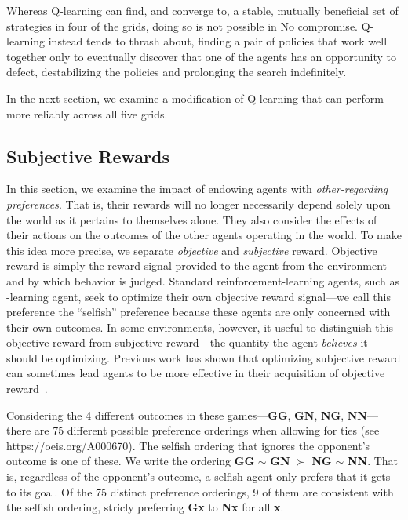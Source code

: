\documentclass[letterpaper]{article}
\begin{document}
Whereas Q-learning can find, and converge to, a stable, mutually
beneficial set of strategies in four of the grids, doing so is not
possible in No compromise. Q-learning instead tends to thrash about,
finding a pair of policies that work well together only to eventually
discover that one of the agents has an opportunity to defect,
destabilizing the policies and prolonging the search indefinitely.

In the next section, we examine a modification of Q-learning that can
perform more reliably across all five grids.

\subsection{Subjective Rewards}

In this section, we examine the impact of endowing agents
with \emph{other-regarding preferences}. That is, their rewards will
no longer necessarily depend solely upon the world as it pertains to
themselves alone. They also consider the effects of their actions on
the outcomes of the other agents operating in the world. To make this
idea more precise, we separate \emph{objective} and \emph{subjective}
reward. Objective reward is simply the reward signal provided to the
agent from the environment and by which behavior is judged. Standard
reinforcement-learning agents, such as \Q-learning agent,
seek to optimize their own objective reward signal---we call this preference the ``selfish''
preference because these agents are only concerned with their own outcomes. In
some environments, however, it useful to distinguish this objective
reward from subjective reward---the quantity the agent \emph{believes}
it should be optimizing. Previous work has shown that optimizing
subjective reward can sometimes lead agents to be more effective in
their acquisition of objective reward~\cite{singh09}.


Considering the 4 different outcomes in these games---{\bf GG}, {\bf
GN}, {\bf NG}, {\bf NN}---there are 75 different possible preference
orderings when allowing for ties (see https://oeis.org/A000670). The
selfish ordering that ignores the opponent's outcome is one of
these. We write the ordering {\bf GG} $\sim$ {\bf GN} $\succ$ {\bf NG}
$\sim$ {\bf NN}. That is, regardless of the opponent's outcome, a
selfish agent only prefers that it gets to its goal. Of the 75
distinct preference orderings, 9 of them are consistent with the
selfish ordering, stricly preferring {\bf Gx} to {\bf Nx} for all {\bf
x}.
\end{document}
